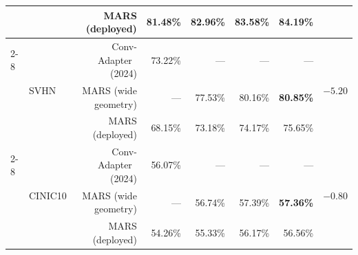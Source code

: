 \documentclass[12pt, a4paper]{report}
\numberwithin{equation}{chapter}
\numberwithin{figure}{chapter}
\numberwithin{table}{chapter}
\numberwithin{algorithm}{chapter}
\begin{document}
\begin{table}[H]
\begin{tabular}{llrrrrrc}
 & & MARS (deployed) & 81.48\% & 82.96\% & 83.58\% & 84.19\% & \\
\cmidrule(lr){2-8}
 & \multirow{3}{*}{SVHN} & Conv-Adapter~\cite{Chen2024ConvAdapter} (2024) & 73.22\% & --- & --- & --- & \multirow{3}{*}{$-5.20$} \\
 & & MARS (wide geometry) & --- & 77.53\% & 80.16\% & \textbf{80.85\%} & \\
 & & MARS (deployed) & 68.15\% & 73.18\% & 74.17\% & 75.65\% & \\
\cmidrule(lr){2-8}
 & \multirow{3}{*}{CINIC10} & Conv-Adapter~\cite{Chen2024ConvAdapter} (2024) & 56.07\% & --- & --- & --- & \multirow{3}{*}{$-0.80$} \\
 & & MARS (wide geometry) & --- & 56.74\% & 57.39\% & \textbf{57.36\%} & \\
 & & MARS (deployed) & 54.26\% & 55.33\% & 56.17\% & 56.56\% & \\
\bottomrule
\end{tabular}
\end{table}
\end{document}
